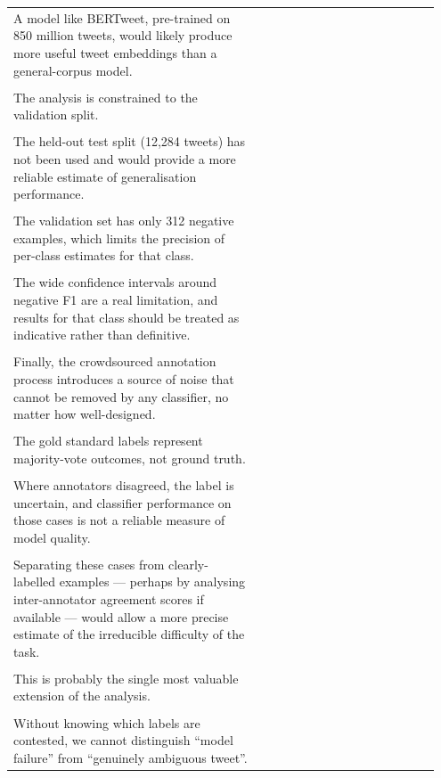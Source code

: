 \documentclass[11pt]{article}
\begin{document}
\begin{longtable}{|p{0.55\linewidth}|p{0.40\linewidth}|}
\hline
\rule{0pt}{3.5cm} & \\
\hline
A model like BERTweet, pre-trained on 850 million tweets, would likely produce more useful tweet embeddings than a general-corpus model. & \\[2pt]
\hline
\rule{0pt}{3.5cm} & \\
\hline
The analysis is constrained to the validation split. & \\[2pt]
\hline
\rule{0pt}{3.5cm} & \\
\hline
The held-out test split (12,284 tweets) has not been used and would provide a more reliable estimate of generalisation performance. & \\[2pt]
\hline
\rule{0pt}{3.5cm} & \\
\hline
The validation set has only 312 negative examples, which limits the precision of per-class estimates for that class. & \\[2pt]
\hline
\rule{0pt}{3.5cm} & \\
\hline
The wide confidence intervals around negative F1 are a real limitation, and results for that class should be treated as indicative rather than definitive. & \\[2pt]
\hline
\rule{0pt}{3.5cm} & \\
\hline
Finally, the crowdsourced annotation process introduces a source of noise that cannot be removed by any classifier, no matter how well-designed. & \\[2pt]
\hline
\rule{0pt}{3.5cm} & \\
\hline
The gold standard labels represent majority-vote outcomes, not ground truth. & \\[2pt]
\hline
\rule{0pt}{3.5cm} & \\
\hline
Where annotators disagreed, the label is uncertain, and classifier performance on those cases is not a reliable measure of model quality. & \\[2pt]
\hline
\rule{0pt}{3.5cm} & \\
\hline
Separating these cases from clearly-labelled examples --- perhaps by analysing inter-annotator agreement scores if available --- would allow a more precise estimate of the irreducible difficulty of the task. & \\[2pt]
\hline
\rule{0pt}{3.5cm} & \\
\hline
This is probably the single most valuable extension of the analysis. & \\[2pt]
\hline
\rule{0pt}{3.5cm} & \\
\hline
Without knowing which labels are contested, we cannot distinguish ``model failure'' from ``genuinely ambiguous tweet''. & \\[2pt]

\end{longtable}
\end{document}
